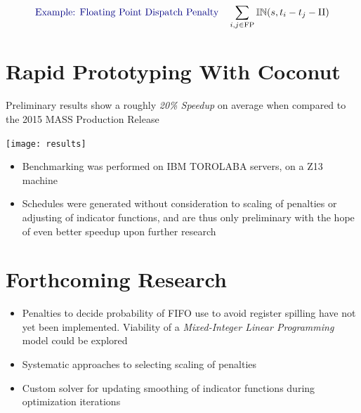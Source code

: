 \documentclass[a0,landscape,24pt]{a0poster}
\begin{document}
\begin{multicols}{3}
\begin{equation}
\text{\color{Navy} Example: Floating Point Dispatch Penalty} \quad \sum_{i,j \in \text{FP}} \mathbb{IN}(s,t_i - t_j - \textrm{II})
\end{equation}

\color{Navy}
\section*{Rapid Prototyping With Coconut}

Preliminary results show a roughly {\it 20\% Speedup} on average when compared to the 2015 MASS Production Release

\begin{center}\vspace{1cm}
\texttt{[image: results]}
\end{center}\vspace{1cm}

\begin{itemize}
 \item Benchmarking was performed on IBM TOROLABA servers, on a Z13 machine
 \item Schedules were generated without consideration to scaling of penalties or adjusting of indicator functions, and are thus only preliminary with the hope of even better speedup upon further research
\end{itemize}	


\color{SaddleBrown} %

\section*{Forthcoming Research}

\begin{itemize}
\item Penalties to decide probability of FIFO use to avoid register spilling have not yet been implemented. Viability of a {\it Mixed-Integer Linear Programming}  model could be explored
\item Systematic approaches to selecting scaling of penalties
\item Custom solver for updating smoothing of indicator functions during optimization iterations
\end{itemize}


\end{multicols}
\end{document}

